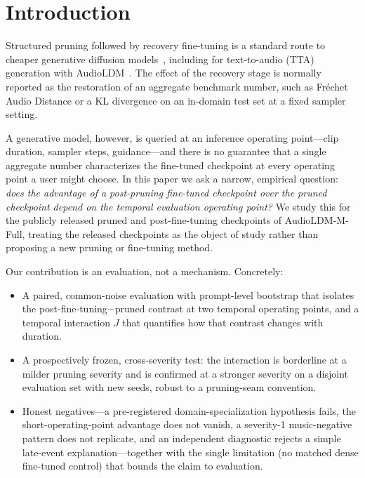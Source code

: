 \documentclass[conference]{IEEEtran}
\begin{document}
\section{Introduction}
Structured pruning followed by recovery fine-tuning is a standard route to cheaper
generative diffusion models~\cite{fang2023diffpruning,kim2024bksdm}, including for
text-to-audio (TTA) generation with AudioLDM~\cite{liu2023audioldm,singh2026pruning}.
The effect of the recovery stage is normally reported as the restoration of an aggregate
benchmark number, such as Fr\'echet Audio Distance or a KL divergence on an in-domain test
set at a fixed sampler setting.

A generative model, however, is queried at an inference operating point---clip duration,
sampler steps, guidance---and there is no guarantee that a single aggregate number
characterizes the fine-tuned checkpoint at every operating point a user might choose. In
this paper we ask a narrow, empirical question: \emph{does the advantage of a
post-pruning fine-tuned checkpoint over the pruned checkpoint depend on the temporal
evaluation operating point?} We study this for the publicly released pruned and
post-fine-tuning checkpoints of AudioLDM-M-Full, treating the released checkpoints as the
object of study rather than proposing a new pruning or fine-tuning method.

Our contribution is an evaluation, not a mechanism. Concretely:
\begin{itemize}
\item A paired, common-noise evaluation with prompt-level bootstrap that isolates the
      post-fine-tuning$-$pruned contrast at two temporal operating points, and a temporal
      interaction $J$ that quantifies how that contrast changes with duration.
\item A prospectively frozen, cross-severity test: the interaction is borderline at a
      milder pruning severity and is confirmed at a stronger severity on a disjoint
      evaluation set with new seeds, robust to a pruning-seam convention.
\item Honest negatives---a pre-registered domain-specialization hypothesis fails, the
      short-operating-point advantage does not vanish, a severity-1 music-negative pattern
      does not replicate, and an independent diagnostic rejects a simple late-event
      explanation---together with the single limitation (no matched dense fine-tuned
      control) that bounds the claim to evaluation.
\end{itemize}
\end{document}
